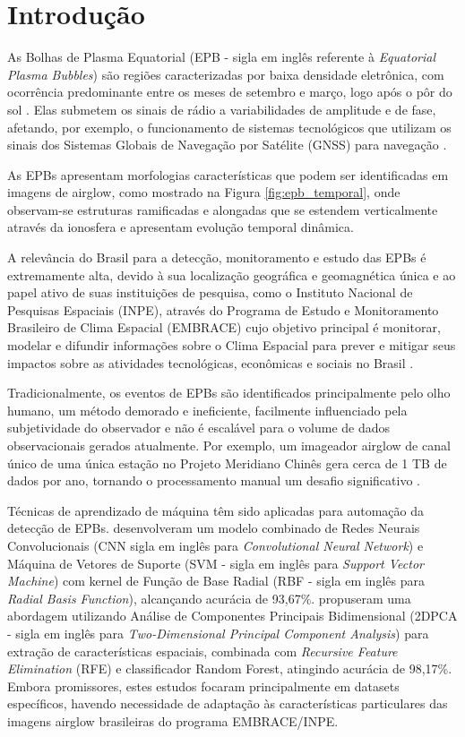 \chapter{Introdução}

As Bolhas de Plasma Equatorial (EPB - sigla em inglês referente à \textit{Equatorial Plasma Bubbles}) são regiões caracterizadas por baixa densidade eletrônica, com ocorrência predominante entre os meses de setembro e março, logo após o pôr do sol \cite{Barros2018}. Elas submetem os sinais de rádio a variabilidades de amplitude e de fase, afetando, por exemplo, o funcionamento de sistemas tecnológicos que utilizam os sinais dos Sistemas Globais de Navegação por Satélite (GNSS) para navegação \cite{Githio2024}.

As EPBs apresentam morfologias características que podem ser identificadas em imagens de airglow, como mostrado na Figura \ref{fig:epb_temporal}, onde observam-se estruturas ramificadas e alongadas que se estendem verticalmente através da ionosfera e apresentam evolução temporal dinâmica.

A relevância do Brasil para a detecção, monitoramento e estudo das EPBs é extremamente alta, devido à sua localização geográfica e geomagnética única e ao papel ativo de suas instituições de pesquisa, como o Instituto Nacional de Pesquisas Espaciais (INPE), através do Programa de Estudo e Monitoramento Brasileiro de Clima Espacial (EMBRACE) cujo objetivo principal é monitorar, modelar e difundir informações sobre o Clima Espacial para prever e mitigar seus impactos sobre as atividades tecnológicas, econômicas e sociais no Brasil \cite{EMBRACE2021}.

Tradicionalmente, os eventos de EPBs são identificados principalmente pelo olho humano, um método demorado e ineficiente, facilmente influenciado pela subjetividade do observador e não é escalável para o volume de dados observacionais gerados atualmente. Por exemplo, um imageador airglow de canal único de uma única estação no Projeto Meridiano Chinês gera cerca de 1 TB de dados por ano, tornando o processamento manual um desafio significativo \cite{Zhong2025}.

Técnicas de aprendizado de máquina têm sido aplicadas para automação da detecção de EPBs.  desenvolveram um modelo combinado de Redes Neurais Convolucionais (CNN sigla em inglês para \textit{Convolutional Neural Network}) e Máquina de Vetores de Suporte (SVM - sigla em inglês para \textit{Support Vector Machine}) com kernel de Função de Base Radial (RBF - sigla em inglês para \textit{Radial Basis Function}), alcançando acurácia de 93,67\%.  propuseram uma abordagem utilizando Análise de Componentes Principais Bidimensional (2DPCA - sigla em inglês para \textit{Two-Dimensional Principal Component Analysis}) para extração de características espaciais, combinada com \textit{Recursive Feature Elimination} (RFE) e classificador Random Forest, atingindo acurácia de 98,17\%. Embora promissores, estes estudos focaram principalmente em datasets específicos, havendo necessidade de adaptação às características particulares das imagens airglow brasileiras do programa EMBRACE/INPE.

